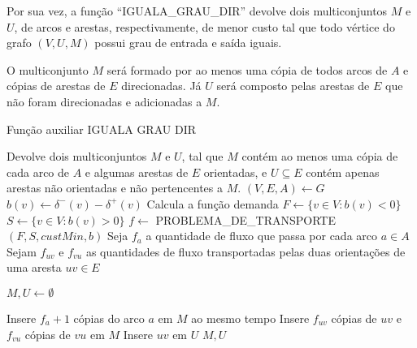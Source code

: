     Por sua vez, a função ``IGUALA\_GRAU\_DIR'' devolve dois multiconjuntos $M$ e $U$, de arcos e arestas, respectivamente, de menor custo tal que todo vértice do grafo $(V, U, M)$ possui grau de entrada e saída iguais.

    O multiconjunto $M$ será formado por ao menos uma cópia de todos arcos de $A$ e cópias de arestas de $E$ direcionadas.
    Já $U$ será composto pelas arestas de $E$ que não foram direcionadas e adicionadas a $M$.


    \begin{algorithm}
        \caption{Função auxiliar IGUALA GRAU DIR}
        \label{mixed-iguala-grau-dir}
        \begin{algorithmic}[1]
        \State \Comment Devolve dois multiconjuntos $M$ e $U$, tal que $M$ contém ao menos uma cópia de cada arco de $A$ e algumas arestas de $E$ orientadas, e $U \subseteq E$ contém apenas arestas não orientadas e não pertencentes a $M$.
            \State $(V, E, A) \gets G$
                \State $b(v) \gets \delta^-(v) - \delta^+(v)$ \Comment Calcula a função demanda
            \EndFor
            \State $F \gets \{v \in V : b(v) < 0\}$
            \State $S \gets \{v \in V : b(v) > 0\}$
            \State $f \gets $ PROBLEMA\_DE\_TRANSPORTE$(F, S, custMin, b)$
            \State Seja $f_a$ a quantidade de fluxo que passa por cada arco $a \in A$ 
            \State Sejam $f_{uv}$ e $f_{vu}$ as quantidades de fluxo transportadas pelas duas orientações de uma aresta $uv \in E$

            \State $M, U \gets \emptyset$

                \State Insere $f_a + 1$ cópias do arco $a$ em $M$
            \EndFor
                  ao mesmo tempo %
                    \State Insere $f_{uv}$ cópias de $uv$ e $f_{vu}$ cópias de $vu$ em $M$
                \Else 
                    \State Insere $uv$ em $U$ 
                \EndIf
            \EndFor
            \State \Return $M, U$
        \EndFunction
        \end{algorithmic}
    \end{algorithm}


